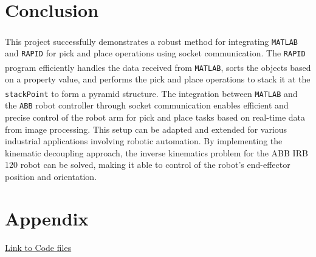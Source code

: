 \section{Conclusion}
This project successfully demonstrates a robust method for integrating \texttt{MATLAB\textsuperscript{\textregistered}} and \texttt{RAPID} for pick and place operations using socket communication. The \texttt{RAPID} program efficiently handles the data received from \texttt{MATLAB\textsuperscript{\textregistered}}, sorts the objects based on a property value, and performs the pick and place operations to stack it at the \texttt{stackPoint} to form a pyramid structure. The
integration between \texttt{MATLAB\textsuperscript{\textregistered}} and the \texttt{ABB} robot controller through socket communication enables efficient and precise control of the robot arm for pick and place tasks based on real-time data from image processing. This setup can be adapted and extended for various industrial applications involving robotic automation. 
By implementing the kinematic decoupling approach, the inverse kinematics problem for the ABB IRB 120 robot can be solved, making it able to control of the robot's end-effector position and orientation.





\section*{Appendix}
\large\href{https://studentsswinburneedu-my.sharepoint.com/:f:/g/personal/101229220_students_swinburne_edu_my/EtwPYa2U7ctPskWgIqP-EhEBreegVWK0ACHmneuZSLz_TQ?e=V1dBor}{Link to Code files}

